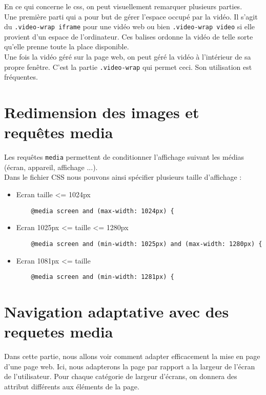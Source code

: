 En ce qui concerne le css, on peut visuellement remarquer plusieurs parties.\\
Une première parti qui a pour but de gérer l'espace occupé par la vidéo. Il s'agit du \texttt{.video-wrap iframe} pour une vidéo web ou bien \texttt{.video-wrap video} si elle provient d'un espace de l'ordinateur. Ces balises ordonne la vidéo de telle sorte qu'elle prenne toute la place disponible.\\

Une fois la vidéo géré sur la page web, on peut géré la vidéo à l'intérieur de sa propre fenêtre. C'est la partie \texttt{.video-wrap} qui permet ceci. Son utilisation est fréquentes.

\section{Redimension des images et requêtes media}
Les requêtes \texttt{media} permettent de conditionner l'affichage suivant les médias (écran, appareil, affichage ...).\\
Dans le fichier CSS nous pouvons ainsi spécifier plusieurs taille d'affichage :
\begin{itemize}
  \item Ecran taille <= 1024px
  \begin{verbatim}
    @media screen and (max-width: 1024px) {
  \end{verbatim}
  \item Ecran 1025px <= taille <= 1280px
  \begin{verbatim}
    @media screen and (min-width: 1025px) and (max-width: 1280px) {
  \end{verbatim}
  \item Ecran 1081px <= taille
  \begin{verbatim}
    @media screen and (min-width: 1281px) {
  \end{verbatim}
\end{itemize}

\section{Navigation adaptative avec des requetes media}
Dans cette partie, nous allons voir comment adapter efficacement la mise en page d'une page web. Ici, nous adapterons la page par rapport a la largeur de l'écran de l'utilisateur. Pour chaque catégorie de largeur d'écrans, on donnera des attribut différents aux éléments de la page.

